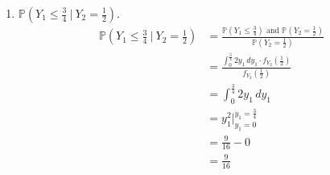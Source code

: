 \documentclass[12pt]{article}
\newcommand{\prob}[1]{\mathbb{P}(#1)}
\newcommand{\cprob}[2]{\mathbb{P}\left(#1 ~|~ #2\right)}
\begin{document}
\begin{enumerate}
\item $\cprob{Y_1 \leq \frac{3}{4}}{Y_2 = \frac{1}{2}}$. 
$$ \begin{aligned}
\cprob{Y_1 \leq \frac{3}{4}}{Y_2 = \frac{1}{2}} &= \frac{\prob{Y_1 \leq \frac{3}{4}} \text{ and } \prob{Y_2 = \frac{1}{2}}}{\prob{Y_2 = \frac{1}{2}}} \\ &= \frac{\int_0^{\frac{3}{4}} 2y_1 \, dy_1 \cdot f_{Y_2}(\frac{1}{2})}{f_{Y_2}(\frac{1}{2})} \\ &= \int_0^{\frac{3}{4}} 2y_1 \, dy_1 \\ &= y_1^2\Big|_{y_1 = 0}^{y_1 = \frac{3}{4}} \\ &= \frac{9}{16} - 0 \\ &= \frac{9}{16} 
\end{aligned} $$ 

\end{enumerate}
\end{document}
